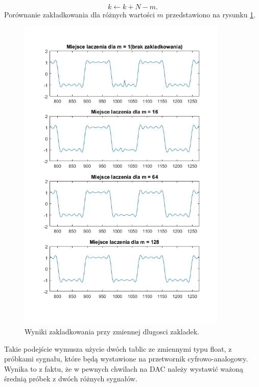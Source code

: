 \begin{equation} \label{equ:sub_4}
k \gets k + N - m.
\end{equation}
Porównanie zakładkowania dla różnych wartości $m$ przedstawiono na rysunku  \ref{rys:sub_overlaps}.
\begin{figure}[H]
	\centering
	\includegraphics[width=10cm]{grafiki/sub_overlaps}
	\captionsetup{justification=centering}
	\caption{Wyniki zakladkowania przy zmiennej dlugosci zakladek.}
	\label{rys:sub_overlaps}
\end{figure}

Takie podejście wymusza użycie dwóch tablic ze zmiennymi typu float, z próbkami sygnału, które będą wystawione na przetwornik cyfrowo-analogowy. Wynika to z faktu, że w pewnych chwilach na DAC należy wystawić ważoną średnią próbek z dwóch różnych sygnałów. 

